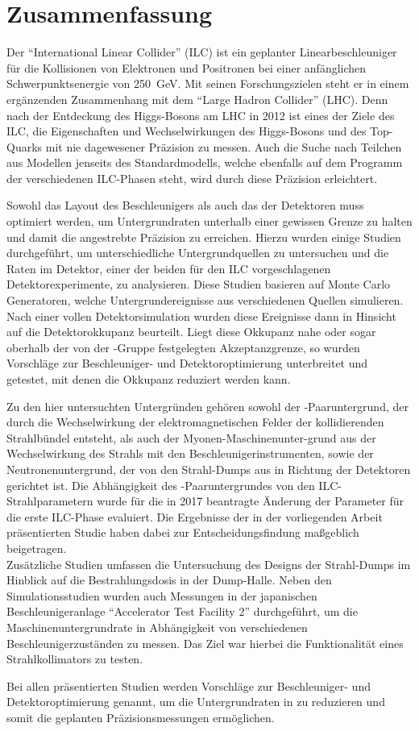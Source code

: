 \chapter*{Zusammenfassung}
Der ``International Linear Collider'' (ILC) ist ein geplanter Linearbeschleuniger f\"ur die Kollisionen von Elektronen und Positronen bei einer anf\"anglichen Schwerpunktsenergie von \SI{250}{\GeV}.
Mit seinen Forschungszielen steht er in einem erg\"anzenden Zusammenhang mit dem ``Large Hadron Collider'' (LHC).
Denn nach der Entdeckung des Higgs-Bosons am LHC in 2012 ist eines der Ziele des ILC, die Eigenschaften und Wechselwirkungen des Higgs-Bosons und des Top-Quarks mit nie dagewesener Präzision zu messen.
Auch die Suche nach Teilchen aus Modellen jenseits des Standardmodells, welche ebenfalls auf dem Programm der verschiedenen ILC-Phasen steht, wird durch diese Präzision erleichtert.

Sowohl das Layout des Beschleunigers als auch das der Detektoren muss optimiert werden, um Untergrundraten unterhalb einer gewissen Grenze zu halten und damit die angestrebte Pr\"azision zu erreichen.
Hierzu wurden einige Studien durchgeführt, um unterschiedliche Untergrundquellen zu untersuchen und die Raten im \sid Detektor, einer der beiden f\"ur den ILC vorgeschlagenen Detektorexperimente, zu analysieren.
Diese Studien basieren auf Monte Carlo Generatoren, welche Untergrundereignisse aus verschiedenen Quellen simulieren.
Nach einer vollen Detektorsimulation wurden diese Ereignisse dann in Hinsicht auf die \sid Detektorokkupanz beurteilt.
Liegt diese Okkupanz nahe oder sogar oberhalb der von der \sid-Gruppe festgelegten Akzeptanzgrenze, so wurden Vorschläge zur Beschleuniger- und Detektoroptimierung unterbreitet und getestet, mit denen die Okkupanz reduziert werden kann.

Zu den hier untersuchten Untergründen gehören sowohl der \positron\electron-Paaruntergrund, der durch die Wechselwirkung der elektromagnetischen Felder der kollidierenden Strahlb\"undel entsteht, als auch der Myonen-Maschinenunter-grund aus der Wechselwirkung des Strahls mit den Beschleunigerinstrumenten, sowie der Neutronenuntergrund, der von den Strahl-Dumps aus in Richtung der Detektoren gerichtet ist.
Die Abhängigkeit des \positron\electron-Paaruntergrundes von den ILC-Strahlparametern wurde f\"ur die in 2017 beantragte Änderung der Parameter f\"ur die erste ILC-Phase evaluiert.
Die Ergebnisse der in der vorliegenden Arbeit präsentierten Studie haben dabei zur Entscheidungsfindung maßgeblich beigetragen.
\\Zusätzliche Studien umfassen die Untersuchung des Designs der Strahl-Dumps im Hinblick auf die Bestrahlungsdosis in der Dump-Halle.
Neben den Simulationsstudien wurden auch Messungen in der japanischen Beschleunigeranlage ``Accelerator Test Facility 2'' durchgeführt, um die Maschinenuntergrundrate in Abhängigkeit von verschiedenen Beschleunigerzust\"anden zu messen.
Das Ziel war hierbei die Funktionalität eines Strahlkollimators zu testen.

Bei allen präsentierten Studien werden Vorschläge zur Beschleuniger- und Detektoroptimierung genannt, um die Untergrundraten in \sid zu reduzieren und somit die geplanten Pr\"azisionsmessungen ermöglichen.